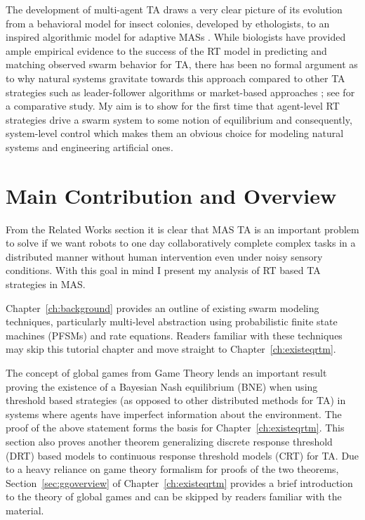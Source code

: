 \documentclass[defaultstyle,12pt]{thesis}
\begin{document}
The development of multi-agent TA draws a very clear picture of its evolution from a behavioral model for insect colonies, developed by ethologists, to an inspired algorithmic model for adaptive MASs \cite{Krieger2000}. While biologists have provided ample empirical evidence to the success of the RT model in predicting and matching observed swarm behavior for TA, there has been no formal argument as to why natural systems gravitate towards this approach compared to other TA strategies such as leader-follower algorithms \cite{Chen2011} or market-based approaches \cite{Amstutz2008,Vig2007}; see \cite{Kalra2006} for a comparative study. My aim is to show for the first time that agent-level RT strategies drive a swarm system to some notion of equilibrium and consequently, system-level control which makes them an obvious choice for modeling natural systems and engineering artificial ones.

\section{Main Contribution and Overview}
%
%
%
From the Related Works section it is clear that MAS TA is an important problem to solve if we want robots to one day collaboratively complete complex tasks in a distributed manner without human intervention even under noisy sensory conditions. With this goal in mind I present my analysis of RT based TA strategies in MAS.

Chapter~\ref{ch:background} provides an outline of existing swarm modeling techniques, particularly multi-level abstraction using probabilistic finite state machines (PFSMs) and rate equations. Readers familiar with these techniques may skip this tutorial chapter and move straight to Chapter~\ref{ch:existeqrtm}. 

The concept of global games from Game Theory lends an important result proving the existence of a Bayesian Nash equilibrium (BNE) when using threshold based strategies (as opposed to other distributed methods for TA) in systems where agents have imperfect information about the environment. The proof of the above statement forms the basis for Chapter~\ref{ch:existeqrtm}. This section also proves another theorem generalizing discrete response threshold (DRT) based models to continuous response threshold models (CRT) for TA. Due to a heavy reliance on game theory formalism for proofs of the two theorems, Section~\ref{sec:ggoverview} of Chapter~\ref{ch:existeqrtm} provides a brief introduction to the theory of global games and can be skipped by readers familiar with the material.
\end{document}
